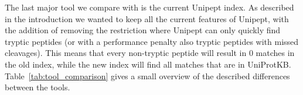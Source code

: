 \documentclass[10pt]{article}
\newenvironment{Table}
{\par\medskip\noindent\minipage{\linewidth}}
{\endminipage\par\medskip}
\begin{document}
\begin{multicols}{2}
        The last major tool we compare with is the current Unipept index.
        As described in the introduction we wanted to keep all the current features of Unipept, with the addition of removing the restriction where Unipept can only quickly find tryptic peptides (or with a performance penalty also tryptic peptides with missed cleavages).
        This means that every non-tryptic peptide will result in 0 matches in the old index, while the new index will find all matches that are in UniProtKB\@.
        Table~\ref{tab:tool_comparison} gives a small overview of the described differences between the tools.

        \begin{Table}
            \centering
            \label{tab:tool_comparison}
        \end{Table}


        \printbibliography[heading=bibintoc]
    \end{multicols}
\end{document}
